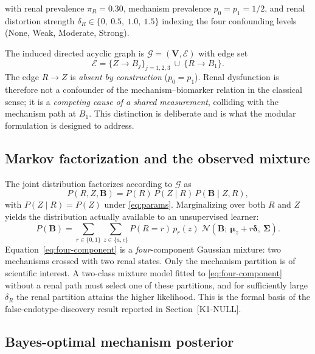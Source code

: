 with renal prevalence $\pi_R = 0.30$, mechanism prevalence
$p_0 = p_1 = 1/2$, and renal distortion strength
$\delta_R \in \{0,\ 0.5,\ 1.0,\ 1.5\}$ indexing the four confounding
levels (None, Weak, Moderate, Strong).

The induced directed acyclic graph is
$\mathcal{G} = (\mathbf{V}, \mathcal{E})$ with edge set
\begin{equation}
  \mathcal{E} = \{ Z \rightarrow B_j \}_{j=1,2,3}
              \ \cup\ \{ R \rightarrow B_1 \}.
  \label{eq:edges}
\end{equation}
The edge $R \rightarrow Z$ is \emph{absent by construction}
($p_0 = p_1$). Renal dysfunction is therefore not a confounder of the
mechanism--biomarker relation in the classical sense; it is a
\emph{competing cause of a shared measurement}, colliding with the
mechanism path at $B_1$. This distinction is deliberate and is what the
modular formulation is designed to address.

\subsection{Markov factorization and the observed mixture}

The joint distribution factorizes according to $\mathcal{G}$ as
\begin{equation}
  P(R, Z, \mathbf{B})
    = P(R)\, P(Z \mid R)\, P(\mathbf{B} \mid Z, R),
  \label{eq:factorization}
\end{equation}
with $P(Z \mid R) = P(Z)$ under \eqref{eq:params}. Marginalizing over
both $R$ and $Z$ yields the distribution actually available to an
unsupervised learner:
\begin{equation}
  P(\mathbf{B}) = \sum_{r \in \{0,1\}} \sum_{z \in \{a,c\}}
    P(R{=}r)\, p_r(z)\;
    \mathcal{N}\!\left( \mathbf{B};\ \bm{\mu}_z + r\bm{\delta},\ \bm{\Sigma} \right).
  \label{eq:four-component}
\end{equation}
Equation~\eqref{eq:four-component} is a \emph{four}-component Gaussian
mixture: two mechanisms crossed with two renal states. Only the
mechanism partition is of scientific interest. A two-class mixture model
fitted to \eqref{eq:four-component} without a renal path must select one
of these partitions, and for sufficiently large $\delta_R$ the renal
partition attains the higher likelihood. This is the formal basis of the
false-endotype-discovery result reported in Section~[K1-NULL].

\subsection{Bayes-optimal mechanism posterior}

